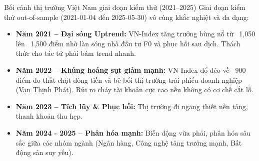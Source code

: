 \documentclass[10pt,aspectratio=169]{beamer}
\begin{document}
\begin{frame}{Bối cảnh thị trường Việt Nam giai đoạn kiểm thử (2021--2025)}
  Giai đoạn kiểm thử out-of-sample (2021-01-04 đến 2025-05-30) vô cùng khắc nghiệt và đa dạng:
  \vspace{0.3cm}
  \begin{itemize}
    \item[\color{secondary}\textbf{1.}] \textbf{Năm 2021 -- Đại sóng Uptrend:} VN-Index tăng trưởng bùng nổ từ ~1,050 lên ~1,500 điểm nhờ làn sóng nhà đầu tư F0 và phục hồi sau dịch. Thách thức cho tác tử phải bám trend nhanh.
    \item[\color{secondary}\textbf{2.}] \textbf{Năm 2022 -- Khủng hoảng sụt giảm mạnh:} VN-Index đổ đèo về ~900 điểm do thắt chặt dòng tiền và bê bối thị trường trái phiếu doanh nghiệp (Vạn Thịnh Phát). Rủi ro cháy tài khoản cực cao nếu không có cơ chế cắt lỗ.
    \item[\color{secondary}\textbf{3.}] \textbf{Năm 2023 -- Tích lũy \& Phục hồi:} Thị trường đi ngang thiết nền tảng, thanh khoản thu hẹp.
    \item[\color{secondary}\textbf{4.}] \textbf{Năm 2024 - 2025 -- Phân hóa mạnh:} Biến động vừa phải, phân hóa sâu sắc giữa các nhóm ngành (Ngân hàng, Công nghệ tăng trưởng mạnh, Bất động sản suy yếu).
  \end{itemize}
\end{frame}
\end{document}
